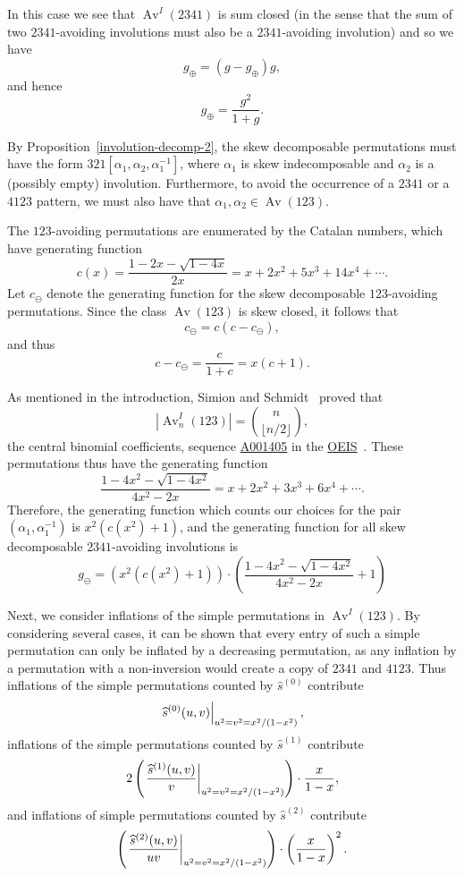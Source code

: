 \documentclass[10pt]{article}
\theoremstyle{plain}
\newcommand{\Av}{\operatorname{Av}}
\newcommand{\ds}{\displaystyle}
\newcommand{\pa}[1]{\left({#1}\right)}
\newcommand{\f}[2]{\ds\frac{{#1}}{{#2}}}
\newcommand{\OEISlink}[1]{\href{http://oeis.org/#1}{#1}}
\newcommand{\OEISref}{\href{http://oeis.org/}{OEIS}~\cite{sloane:the-on-line-enc:}}
\newcommand{\OEIS}[1]{sequence \OEISlink{#1} in the \OEISref}
\newcommand{\eval}[2][\right]{\relax\ifx#1\right\relax \left.\fi#2#1\rvert}
\begin{document}
In this case we see that $\Av^I(2341)$ is sum closed (in the sense that the sum of two $2341$-avoiding involutions must also be a $2341$-avoiding involution) and so we have
	\[g_\oplus = (g - g_\oplus)g,\]
and hence
	\begin{equation}
	\label{eq-2341-1}
	g_\oplus = \f{g^2}{1+g}.
	\end{equation}

By Proposition~\ref{involution-decomp-2}, the skew decomposable permutations must have the form $321[\alpha_1,\alpha_2,\alpha_1^{-1}]$, where $\alpha_1$ is skew indecomposable and $\alpha_2$ is a (possibly empty) involution. Furthermore, to avoid the occurrence of a $2341$ or a $4123$ pattern, we must also have that $\alpha_1,\alpha_2\in \Av(123)$.

The $123$-avoiding permutations are enumerated by the Catalan numbers, which have generating function
	\[c(x) = \f{1-2x-\sqrt{1-4x}}{2x} = x + 2x^2 + 5x^3 + 14x^4 + \cdots.\]
Let $c_\ominus$ denote the generating function for the skew decomposable $123$-avoiding permutations. Since the class $\Av(123)$ is skew closed, it follows that
	\[c_\ominus = c(c-c_\ominus),\]
and thus
	\[c-c_\ominus = \f{c}{1+c} = x(c+1).\]

As mentioned in the introduction, Simion and Schmidt~\cite{simion:restricted-perm:} proved that
	\[
	|\Av^I_n(123)|={n\choose \lfloor n/2\rfloor},
	\]
the central binomial coefficients, \OEIS{A001405}. These permutations thus have the generating function
	\[\frac{1-4x^2-\sqrt{1-4x^2}}{4x^2-2x} = x + 2x^2 + 3x^3 + 6x^4 + \cdots.\]
Therefore, the generating function which counts our choices for the pair $(\alpha_1,\alpha_1^{-1})$ is $x^2(c(x^2)+1)$, and the generating function for all skew decomposable $2341$-avoiding involutions is
	\begin{equation}
	\label{eq-2341-2}
	g_\ominus
	=
	\pa{x^2\pa{c(x^2)+1}}
	\cdot
	\pa{\frac{1-4x^2-\sqrt{1-4x^2}}{4x^2-2x}+1}
	\end{equation}

Next, we consider inflations of the simple permutations in $\Av^I(123)$. By considering several cases, it can be shown that every entry of such a simple permutation can only be inflated by a decreasing permutation, as any inflation by a permutation with a non-inversion would create a copy of $2341$ and $4123$. Thus inflations of the simple permutations counted by $\widehat{s}^{(0)}$ contribute
	\begin{equation}
	\label{eq-2341-4}
	\eval{\widehat{s}^{(0)}(u,v)}_{u^2=v^2=x^2/(1-x^2)},
	\end{equation}
inflations of the simple permutations counted by $\widehat{s}^{(1)}$ contribute
	\begin{equation}
	\label{eq-2341-5}
	2\pa{\eval{\f{\widehat{s}^{(1)}(u,v)}{v}}_{u^2=v^2=x^2/(1-x^2)}}
	\cdot
	\f{x}{1-x},
	\end{equation}
and inflations of simple permutations counted by $\widehat{s}^{(2)}$ contribute
	\begin{equation}
	\label{eq-2341-6}
	\pa{\eval{\f{\widehat{s}^{(2)}(u,v)}{uv}}_{u^2=v^2=x^2/(1-x^2)}}
	\cdot
	\pa{\f{x}{1-x}}^2.
	\end{equation}
\end{document}
